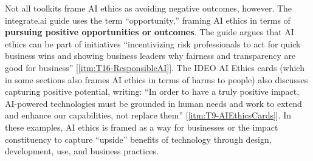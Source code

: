 \documentclass[acmsmall]{acmart}
\begin{document}
Not all toolkits frame AI ethics as avoiding negative outcomes, however. The integrate.ai guide uses the term ``opportunity,'' framing AI ethics in terms of \textbf{pursuing positive opportunities or outcomes}. The guide argues that AI ethics can be part of initiatives ``incentivizing risk professionals to act for quick business wins and showing business leaders why fairness and transparency are good for business'' [\ref{itm:T16-ResponsibleAI}]. The IDEO AI Ethics cards (which in some sections also frames AI ethics in terms of harms to people) also discusses capturing positive potential, writing: ``In order to have a truly positive impact, AI-powered technologies must be grounded in human needs and work to extend and enhance our capabilities, not replace them'' [\ref{itm:T9-AIEthicsCards}]. 
In these examples, AI ethics is framed as a way for businesses or the impact constituency to capture ``upside'' benefits of technology through design, development, use, and business practices. 
\end{document}
